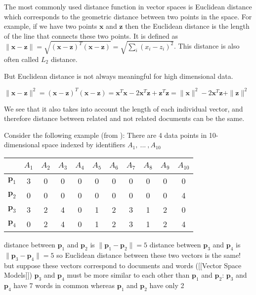 The most commonly used distance function in vector spaces is Euclidean 
distance which corresponds to the geometric distance between two points 
in the space. For example, if we have two points $\mathbf x$ and 
$\mathbf z$ then the Euclidean distance is the
length of the line that connects these two points. 
It is defined as
$\| \mathbf x - \mathbf z \| = \sqrt{ (\mathbf x - \mathbf z)^T (\mathbf x - \mathbf z) } = \sqrt{\sum_i (x_i - z_i)^2}$. This distance is also often called 
$L_2$ distance.

But Euclidean distance is not always meaningful for high dimensional data. 

$\| \mathbf x - \mathbf z \|^2 = (\mathbf x - \mathbf z)^T (\mathbf x - \mathbf z) = 
\mathbf x^T \mathbf x - 2 \mathbf x^T \mathbf z + \mathbf z^T \mathbf z = 
\| \mathbf x \|^2 - 2 \mathbf x^T \mathbf z + \| \mathbf z \|^2$

We see that it also takes into account the length of each individual vector, 
and therefore distance between related and not related documents can be 
the same. 

Consider the following example (from \cite{ertoz2003finding}):
There are 4 data points in 10-dimensional space indexed by 
identifiers $A_1, \ ... \ , A_{10}$


\begin{tabular}{|c|cccccccccc|}
  \hline
~ &  $A_1$ &   $A_2$ &   $A_3$ &  $A_4$ &  $A_5$ &  $A_6$ &  $A_7$ &  $A_8$ &  $A_9$ &  $A_{10}$ \\
  \hline
$\mathbf p_1$ &  3 &  0 &  0 &  0 &  0 &  0 &  0 &  0 &  0 &  0 \\
$\mathbf p_2$ &  0 &  0 &  0 &  0 &  0 &  0 &  0 &  0 &  0 &  4 \\
$\mathbf p_3$ &  3 &  2 &  4 &  0 &  1 &  2 &  3 &  1 &  2 &  0 \\
$\mathbf p_4$ &  0 &  2 &  4 &  0 &  1 &  2 &  3 &  1 &  2 &  4 \\
  \hline
\end{tabular}


distance between $\mathbf p_1$ and $\mathbf p_2$ is $\| \mathbf p_1 - \mathbf p_2\| = 5$
distance between $\mathbf p_3$ and $\mathbf p_4$ is $\| \mathbf p_3 - \mathbf p_4\| = 5$
so Euclidean distance between these two vectors is the same!
 but suppose these vectors correspond to documents and words ([[Vector Space Models]])
 $\mathbf p_3$ and $\mathbf p_4$ must be more similar to each other than $\mathbf p_1$ and $\mathbf p_2$: $\mathbf p_3$ and $\mathbf p_4$ have 7 words in common whereas $\mathbf p_1$ and $\mathbf p_2$ have only 2


